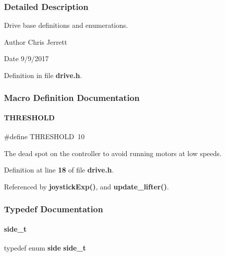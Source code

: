 \subsubsection{Detailed Description}
Drive base definitions and enumerations. 

\begin{DoxyAuthor}{Author}
Chris Jerrett 
\end{DoxyAuthor}
\begin{DoxyDate}{Date}
9/9/2017 
\end{DoxyDate}


Definition in file \textbf{ drive.\+h}.



\subsubsection{Macro Definition Documentation}
\mbox{\label{drive_8h_a4679d8ea8690999a6c6c7c0cb245c879}} 
\paragraph{T\+H\+R\+E\+S\+H\+O\+LD}
{\footnotesize\ttfamily \#define T\+H\+R\+E\+S\+H\+O\+LD~10}



The dead spot on the controller to avoid running motors at low speeds. 



Definition at line \textbf{ 18} of file \textbf{ drive.\+h}.



Referenced by \textbf{ joystick\+Exp()}, and \textbf{ update\+\_\+lifter()}.



\subsubsection{Typedef Documentation}
\mbox{\label{drive_8h_a9df2afd2f1acb97019655e5e730609c7}} 
\paragraph{side\+\_\+t}
{\footnotesize\ttfamily typedef enum \textbf{ side}  \textbf{ side\+\_\+t}}



